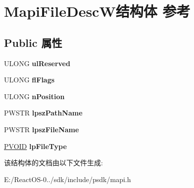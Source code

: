 \hypertarget{struct_mapi_file_desc_w}{}\section{Mapi\+File\+Desc\+W结构体 参考}
\label{struct_mapi_file_desc_w}
\subsection*{Public 属性}
\begin{DoxyCompactItemize}
\item 
\mbox{\label{struct_mapi_file_desc_w_a5b55b932ac53d268bdcf6ab587c251ec}} 
U\+L\+O\+NG {\bfseries ul\+Reserved}
\item 
\mbox{\label{struct_mapi_file_desc_w_a56f32593ce2d42ff1e072df4ba5cb169}} 
U\+L\+O\+NG {\bfseries fl\+Flags}
\item 
\mbox{\label{struct_mapi_file_desc_w_a86c4a2275841009087701bff152bdf4c}} 
U\+L\+O\+NG {\bfseries n\+Position}
\item 
\mbox{\label{struct_mapi_file_desc_w_ad2cc0c4204db04a9fa49a1e18f91f52f}} 
P\+W\+S\+TR {\bfseries lpsz\+Path\+Name}
\item 
\mbox{\label{struct_mapi_file_desc_w_aedd66f396dcb971b40ce90c698e8cb71}} 
P\+W\+S\+TR {\bfseries lpsz\+File\+Name}
\item 
\mbox{\label{struct_mapi_file_desc_w_a8d521ba1784fe2dba5c46f5c1eaa157b}} 
\hyperlink{interfacevoid}{P\+V\+O\+ID} {\bfseries lp\+File\+Type}
\end{DoxyCompactItemize}


该结构体的文档由以下文件生成\+:\begin{DoxyCompactItemize}
\item 
E\+:/\+React\+O\+S-\/0../sdk/include/psdk/mapi.\+h\end{DoxyCompactItemize}
